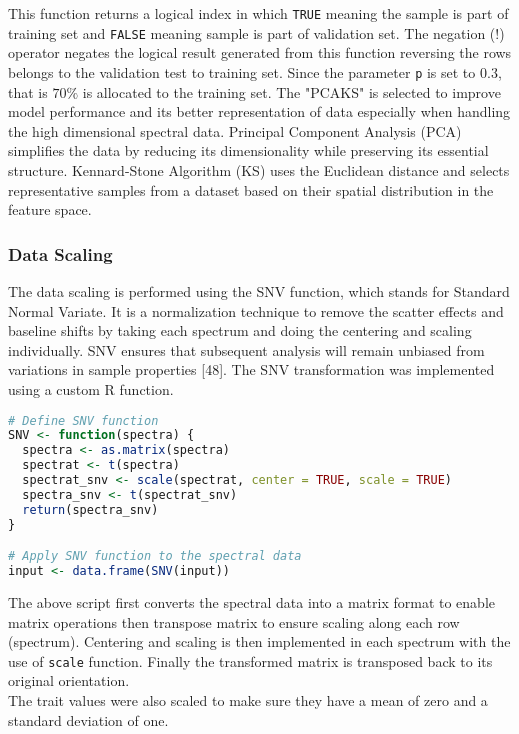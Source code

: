 \documentclass[12pt,a4paper]{report}
\begin{document}
This function returns a logical index in which \texttt{TRUE} meaning the sample is part of training set and \texttt{FALSE} meaning sample is part of validation set. The negation (!) operator negates the logical result generated from this function reversing the rows belongs to the validation test to training set. Since the parameter \texttt{p} is set to $0.3$, that is $70\%$ is allocated to the training set. The "PCAKS" is selected to improve model performance and its better representation of data especially when handling the high dimensional spectral data. Principal Component Analysis (PCA) simplifies the data by reducing its dimensionality while preserving its essential structure. Kennard-Stone Algorithm (KS) uses the Euclidean distance and selects representative samples from a dataset based on their spatial distribution in the feature space.


\subsubsection*{Data Scaling}
The data scaling is performed using the SNV function, which stands for Standard Normal Variate. It is a normalization technique to remove the scatter effects and baseline shifts by taking each spectrum and doing the centering and scaling individually. SNV ensures that subsequent analysis will remain unbiased from variations in sample properties [48]. The SNV transformation was implemented using a custom R function. \\

\begin{lstlisting}[language=R, style=mystyle]
# Define SNV function
SNV <- function(spectra) {
  spectra <- as.matrix(spectra)
  spectrat <- t(spectra)
  spectrat_snv <- scale(spectrat, center = TRUE, scale = TRUE)
  spectra_snv <- t(spectrat_snv)
  return(spectra_snv)
}

# Apply SNV function to the spectral data
input <- data.frame(SNV(input))
\end{lstlisting}

The above script first converts the spectral data into a matrix format to enable matrix operations then transpose matrix to ensure scaling along each row (spectrum). Centering and scaling is then implemented in each spectrum with the use of \texttt{scale} function. Finally the transformed matrix is transposed back to its original orientation. \\

The trait values were also scaled to make sure they have a mean of zero and a standard deviation of one. \\
\end{document}
